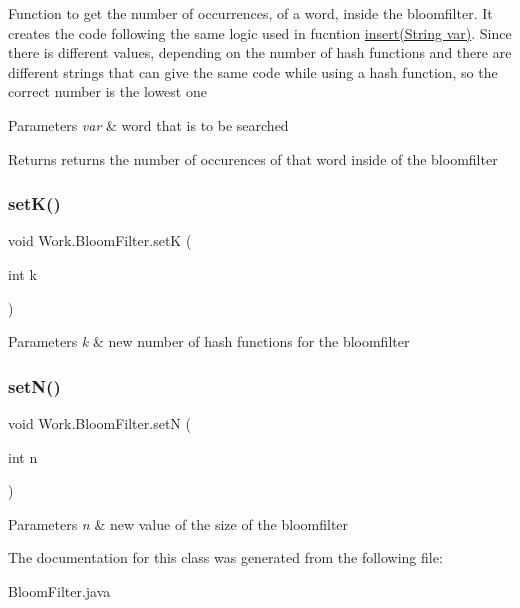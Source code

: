 Function to get the number of occurrences, of a word, inside the bloomfilter. It creates the code following the same logic used in fucntion \hyperlink{classWork_1_1BloomFilter_a43575a7e07ba726869e99467e123bc76}{insert(\+String var)}. Since there is different values, depending on the number of hash functions and there are different strings that can give the same code while using a hash function, so the correct number is the lowest one 
\begin{DoxyParams}{Parameters}
{\em var} & word that is to be searched \\
\hline
\end{DoxyParams}
\begin{DoxyReturn}{Returns}
returns the number of occurences of that word inside of the bloomfilter 
\end{DoxyReturn}
\mbox{\label{classWork_1_1BloomFilter_a34c584cddceb2b532bba959394a99ef5}} 
\subsubsection{\texorpdfstring{set\+K()}{setK()}}
{\footnotesize\ttfamily void Work.\+Bloom\+Filter.\+setK (\begin{DoxyParamCaption}\item[{int}]{k }\end{DoxyParamCaption})\hspace{0.3cm}{\ttfamily [inline]}}


\begin{DoxyParams}{Parameters}
{\em k} & new number of hash functions for the bloomfilter \\
\hline
\end{DoxyParams}
\mbox{\label{classWork_1_1BloomFilter_ad89720e05fbbd6383c45c3a7838c8789}} 
\subsubsection{\texorpdfstring{set\+N()}{setN()}}
{\footnotesize\ttfamily void Work.\+Bloom\+Filter.\+setN (\begin{DoxyParamCaption}\item[{int}]{n }\end{DoxyParamCaption})\hspace{0.3cm}{\ttfamily [inline]}}


\begin{DoxyParams}{Parameters}
{\em n} & new value of the size of the bloomfilter \\
\hline
\end{DoxyParams}


The documentation for this class was generated from the following file\+:\begin{DoxyCompactItemize}
\item 
Bloom\+Filter.\+java\end{DoxyCompactItemize}
